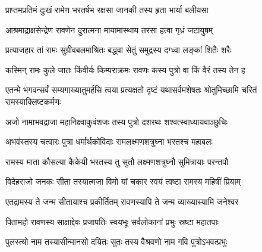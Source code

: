 
\translink{}

\storymeta

\resetShloka


\twolineshloka
{प्राप्तमप्रतिमं दुःखं रामेण भरतर्षभ}
{रक्षसा जानकी तस्य हृता भार्या बलीयसा}


\twolineshloka
{आश्रमाद्राक्षसेन्द्रेण रावणेन दुरात्मना}
{मायामास्थाय तरसा हत्वा गृध्रं जटायुषम्}


\twolineshloka
{प्रत्याजहार तां रामः सुग्रीवबलमाश्रितः}
{बद्ध्वा सेतुं समुद्रस्य दग्ध्वा लङ्कां शितैः शरैः}



\twolineshloka
{कस्मिन् रामः कुले जातः किंवीर्यः किम्पराक्रमः}
{रावणः कस्य पुत्रो वा किं वैरं तस्य तेन ह}


\threelineshloka
{एतन्मे भगवन्सर्वं सम्यगाख्यातुमर्हसि}
{त्वया प्रत्यक्षतो दृष्टं यथासर्वमशेषतः}
{श्रोतुमिच्छामि चरितं रामस्याक्लिष्टकर्मणः}



\twolineshloka
{अजो नामाभवद्राजा महानिक्ष्वाकुवंशजः}
{तस्य पुत्रो दशरथः शश्वत्स्वाध्यायवाञ्छुचिः}


\twolineshloka
{अभवंस्तस्य चत्वारः पुत्रा धर्मार्थकोविदाः}
{रामलक्ष्मणशत्रुघ्ना भरतश्च महाबलः}


\twolineshloka
{रामस्य माता कौसल्या कैकेयी भरतस्य तु}
{सुतौ लक्ष्मणशत्रुघ्नौ सुमित्रायाः परन्तपौ}


\twolineshloka
{विदेहराजो जनकः सीता तस्यात्मजा विमो}
{यां चकार स्वयं त्वष्टा रामस्य महिषीं प्रियाम्}


\twolineshloka
{एतद्रामस्य ते जन्म सीतायाश्च प्रकीर्तितम्}
{रावणस्यापि ते जन्म व्याख्यास्यामि जनेश्वर}


\twolineshloka
{पितामहो रावणस्य साक्षाद्देवः प्रजापतिः}
{स्वयभूः सर्वलोकानां प्रभुः स्रष्टा महातपाः}


\twolineshloka
{पुलस्त्यो नाम तस्यासीन्मानसो दयितः सुतः}
{तस्य वैश्रवणो नाम गवि पुत्रोऽभवत्प्रभुः}


